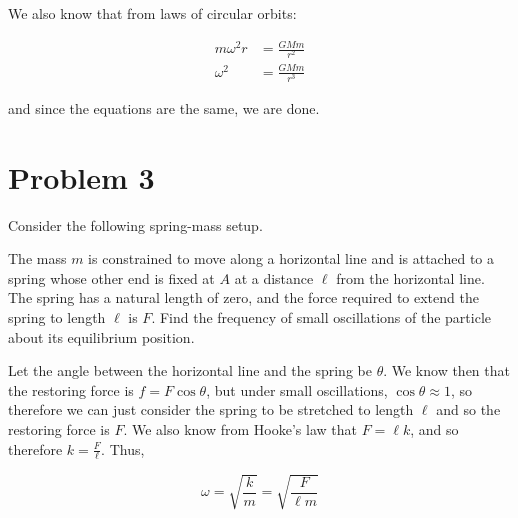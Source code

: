 \documentclass[10pt]{article}
\begin{document}
\begin{enumerate}[(a)]
\begin{solution}
            We also know that from laws of circular orbits: 

            \begin{align*}
                m\omega^2r &= \frac{GMm}{r^2} \\
                \omega^2 &= \frac{GMm}{r^3}
            \end{align*}

            and since the equations are the same, we are done.
        \end{solution}
    \end{enumerate}

    \pagebreak

    \section*{Problem 3}

    Consider the following spring-mass setup. 
    
    \begin{center}
    \end{center}

    The mass $m$ is constrained to move along a horizontal line and is attached to a spring whose other end is fixed at $A$ at a distance $\ell$ from the horizontal line. The spring has a natural length of zero, and the force required to extend the spring to length $\ell$ is $F$. Find the frequency of small oscillations of the particle about its equilibrium position.

    \begin{solution}
        Let the angle between the horizontal line and the spring be $\theta$. We know then that the restoring force is $f = F \cos \theta$, but under small oscillations, $\cos \theta \approx 1$, so therefore we can just consider the spring to be stretched to length $\ell$ and so the restoring force is $F$. We also know from Hooke's law that $F = \ell k$, and so therefore $k = \frac{F}{\ell}$. Thus, 

        \[ \omega = \sqrt{\frac km} = \sqrt{\frac{F}{\ell m}}\] 
    \end{solution}
\end{document}

